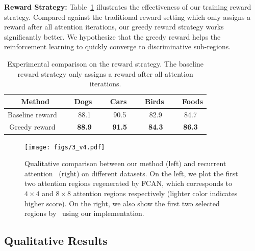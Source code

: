 \documentclass[10pt,twocolumn,letterpaper]{article}
\begin{document}
\textbf{Reward Strategy:}
Table~\ref{tab:reward_strategy} illustrates the effectiveness of our training reward strategy.
Compared against the traditional reward setting which only assigns a reward after all attention iterations, our greedy reward strategy works significantly better.
We hypothesize that the greedy reward helps the reinforcement learning to quickly converge to discriminative sub-regions.

\begin{table}[t]
\centering
{}
\addtolength{\tabcolsep}{2.5pt}
\begin{tabular}{c c c c c}
\toprule[0.2 em]
Method & \ Dogs \ & \ Cars \ & \ Birds \  & \ Foods \\
\toprule[0.2 em]
Baseline reward \  & 88.1 &  90.5  &  82.9  &   84.7 \\
Greedy reward \ & \bf{88.9} & \bf{91.5} & \bf{84.3} & \bf{86.3} \\
\bottomrule[0.1 em]
\end{tabular}
\vspace{1pt}
\caption{Experimental comparison on the reward strategy.
The baseline reward strategy only assigns a reward after all attention iterations.}
\label{tab:reward_strategy}
\end{table}

\begin{figure}[t]
\begin{center}
\texttt{[image: figs/3\_v4.pdf]}
\end{center}
\caption{Qualitative comparison between our method (left) and recurrent attention~\cite{sermanet2014attention} (right) on different datasets.
On the left, we plot the first two attention regions regenerated by FCAN, which corresponds to $4\times4$ and $8\times8$ attention regions respectively (lighter color indicates higher score).
On the right, we also show the first two selected regions by~\cite{sermanet2014attention} using our implementation.
}
\label{fig:attention_illustration}
\vspace{-8pt}
\end{figure}

\subsection{Qualitative Results}

\end{document}

